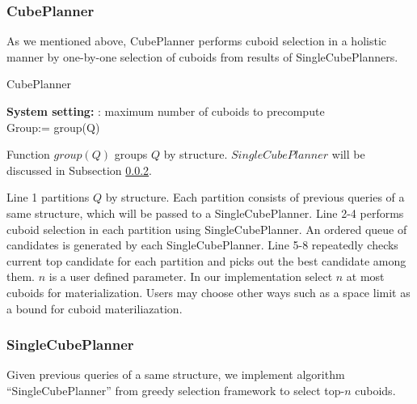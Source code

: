 \subsubsection{CubePlanner}
\label{CubePlanner}

As we mentioned above, CubePlanner performs cuboid selection in a holistic manner by one-by-one selection of cuboids from results of SingleCubePlanners. 

\begin{algorithm}[H]
	\caption{CubePlanner}
	\LinesNumbered 
	\textbf{System setting:} 
	: maximum number of cuboids to precompute\\ 
	Group:= group(Q)\;
	
	
\end{algorithm}
\clearpage

Function $group(Q)$ groups $Q$ by structure. $SingleCubePlanner$ will be discussed in Subsection \ref{SingleCubePlanner}. 

Line 1 partitions $Q$ by structure. Each partition consists of previous queries of a same structure, which will be passed to a SingleCubePlanner. Line 2-4 performs cuboid selection in each partition using SingleCubePlanner. An ordered queue of candidates is generated by each SingleCubePlanner. Line 5-8 repeatedly checks current top candidate for each partition and picks out the best candidate among them. $n$ is a user defined parameter. In our implementation select $n$ at most cuboids for materialization.  Users may choose other ways such as a space limit as a bound for cuboid materiliazation.

\subsubsection{SingleCubePlanner}
\label{SingleCubePlanner}

Given previous queries of a same structure, we implement algorithm ``SingleCubePlanner'' from greedy selection framework to select top-$n$ cuboids. 


